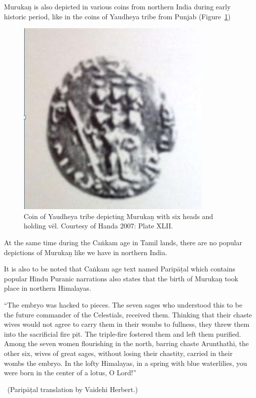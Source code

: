 Murukaṉ is also depicted in various coins from northern India during early historic period, like in the coins of Yaudheya tribe from Punjab (Figure~\ref{art5-fig9})

\begin{figure}[!tb]
\includegraphics{"images/article-05/art05-fig09.jpg"}
\caption{Coin of Yaudheya tribe depicting Murukaṉ with six heads and holding vēl. Courtesy of Handa 2007: Plate XLII.}\label{art5-fig9}
\end{figure}

At the same time during the Caṅkam age in Tamil lands, there are no popular depictions of Murukaṉ like we have in northern India.

It is also to be noted that Caṅkam age text named Paripāṭal which contains popular Hindu Puranic narrations also states that the birth of Murukaṉ took place in northern Himalayas.

\begin{myquote}
“The embryo was hacked to pieces. The seven sages who understood this to be the future commander of the Celestials, received them. Thinking that their chaste wives would not agree to carry them in their wombs to fullness, they threw them into the sacrificial fire pit. The triple-fire fostered them and left them purified. Among the seven women flourishing in the north, barring chaste Arunthathi, the other six, wives of great sages, without losing their chastity, carried in their wombs the embryo. In the lofty Himalayas, in a spring with blue waterlilies, you were born in the center of a lotus, O Lord!” 

~\hfill (Paripāṭal translation by Vaidehi Herbert.)
\end{myquote}

